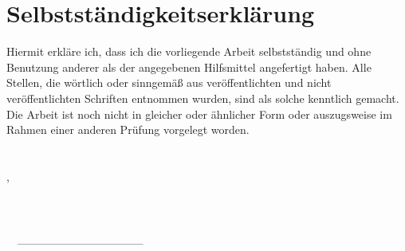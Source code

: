 %
%

\chapter*{Selbstständigkeitserklärung}

Hiermit erkläre ich, dass ich die vorliegende Arbeit selbstständig und ohne Benutzung anderer als der angegebenen Hilfsmittel angefertigt haben.
Alle Stellen, die wörtlich oder sinngemäß aus veröffentlichten und nicht veröffentlichten Schriften
entnommen wurden, sind als solche kenntlich gemacht. Die Arbeit ist noch nicht in
gleicher oder ähnlicher Form oder auszugsweise im Rahmen einer anderen Prüfung
vorgelegt worden.
\\
\\
\\
\hspace*{\fill}\cfgAuthorCity, \cfgDateLastModification
\\
\\
\\
\\
\hspace*{\fill}\cfgAuthorName\ \ \_\_\_\_\_\_\_\_\_\_\_\_\_\_\_
